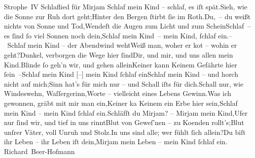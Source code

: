 \pstart
           Strophe IV\pend
           \settowidth{\longeste}{}\settowidth{\longestz}{}\settowidth{\longestd}{}\settowidth{\longestv}{}\settowidth{\longestf}{}\addtolength\longeste{1em}
        \addtolength\longestz{1em}
      \vspace{1em}{\vspace{1\baselineskip}}
\pstart
           {\pb}Schlaflied für Mirjam\pend
           {\vspace{1\baselineskip}}\stanza{}Schlaf mein Kind – schlaf, es iſt spät.Sieh, wie die Sonne zur Ruh dort geht;Hinter den Bergen ſtirbt ſie im Roth.Du, – du weißt nichts von Sonne und Tod,Wendeſt die Augen zum Licht und zum ScheinSchlaf – es ſind ſo viel Sonnen noch dein,Schlaf mein Kind – mein Kind, ſchlaf ein.\stanzaend{}\stanza{}– Schlaf mein Kind – der Abendwind wehtWeiß man, woher er ko{\geminationm}t – wohin er geht?Dunkel, verborgen die Wege hier ſindDir, und mir, und uns allen mein Kind.Blinde ſo geh’n wir, und gehen alleinKeiner kann Keinem Gefährte hier ſein –Schlaf mein Kind {[}–{]} mein Kind ſchlaf ein\stanzaend{}\stanza{}{\pb}Schlaf mein Kind – und horch
                     nicht auf mich;Sinn hat’s für mich nur – und Schall iſts für dich.Schall nur, wie Windeswehn, Waſſergerinn,Worte – vielleicht eines Lebens Gewinn.Was ich gewonnen, gräbt mit mir man ein,Keiner ka{\geminationn} Keinem ein Erbe hier sein,Schlaf mein Kind – mein Kind ſchlaf ein.\stanzaend{}\stanza{}Schläfſt du Mirjam? – Mirjam mein Kind,Ufer nur ſind wir, und tief in uns rinntBlut von Geweſ’nen – zu Ko{\geminationm}enden rollt’s;Blut unſrer Väter, voll Unruh und Stolz.In uns sind alle; wer fühlt ſich allein?Du biſt ihr Leben – ihr Leben iſt dein,Mirjam mein Leben – mein Kind ſchlaf
                     ein.\stanzaend{}
\pstart
           \spacefill\mbox{Richard Beer-Hofmann}\pend
           \endnumbering{}  
      